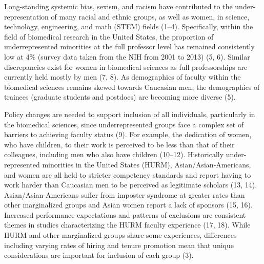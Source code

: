 \documentclass[10pt,]{article}
\begin{document}
Long-standing systemic bias, sexism, and racism have contributed to the
under-representation of many racial and ethnic groups, as well as women,
in science, technology, engineering, and math (STEM) fields (1--4).
Specifically, within the field of biomedical research in the United
States, the proportion of underrepresented minorities at the full
professor level has remained consistently low at 4\% (survey data taken
from the NIH from 2001 to 2013) (5, 6). Similar discrepancies exist for
women in biomedical sciences as full professorships are currently held
mostly by men (7, 8). As demographics of faculty within the biomedical
sciences remains skewed towards Caucasian men, the demographics of
trainees (graduate students and postdocs) are becoming more diverse (5).

Policy changes are needed to support inclusion of all individuals,
particularly in the biomedical sciences, since underrepresented groups
face a complex set of barriers to achieving faculty status (9). For
example, the dedication of women, who have children, to their work is
perceived to be less than that of their colleagues, including men who
also have children (10--12). Historically under-represented minorities
in the United States (HURM), Asian/Asian-Americans, and women are all
held to stricter competency standards and report having to work harder
than Caucasian men to be perceived as legitimate scholars (13, 14).
Asian/Asian-Americans suffer from imposter syndrome at greater rates
than other marginalized groups and Asian women report a lack of sponsors
(15, 16). Increased performance expectations and patterns of exclusions
are consistent themes in studies characterizing the HURM faculty
experience (17, 18). While HURM and other marginalized groups share some
experiences, differences including varying rates of hiring and tenure
promotion mean that unique considerations are important for inclusion of
each group (3).
\end{document}
